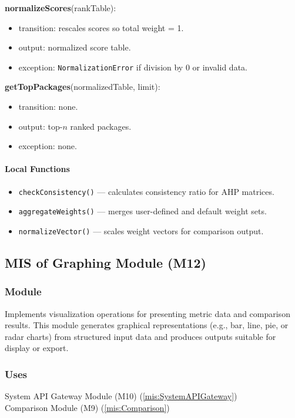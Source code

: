 \documentclass[12pt, titlepage]{article}
\begin{document}
\noindent \textbf{normalizeScores}(rankTable):
\begin{itemize}
  \item transition: rescales scores so total weight = 1.
  \item output: normalized score table.
  \item exception: \texttt{NormalizationError} if division by 0 or invalid data.
\end{itemize}

\noindent \textbf{getTopPackages}(normalizedTable, limit):
\begin{itemize}
  \item transition: none.
  \item output: top-\(n\) ranked packages.
  \item exception: none.
\end{itemize}

\paragraph{Local Functions}
\begin{itemize}
  \item \texttt{checkConsistency()} — calculates consistency ratio for AHP matrices.
  \item \texttt{aggregateWeights()} — merges user-defined and default weight sets.
  \item \texttt{normalizeVector()} — scales weight vectors for comparison output.
\end{itemize}


\subsection{MIS of Graphing Module (M12)}
  \label{mis:GraphingModule}

  \subsubsection{Module}
  Implements visualization operations for presenting metric data and comparison
  results. This module generates graphical representations (e.g., bar, line, pie,
  or radar charts) from structured input data and produces outputs suitable for
  display or export.


  \subsubsection{Uses}
  System API Gateway Module (M10) (\ref{mis:SystemAPIGateway})\\
  Comparison Module (M9)  (\ref{mis:Comparison})\\
\end{document}
